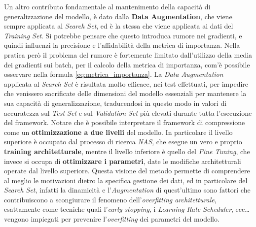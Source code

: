 Un altro contributo fondamentale al mantenimento della capacità di generalizzazione del modello, è dato dalla \textbf{Data Augmentation}, che viene sempre applicata al \textit{Search Set}, ed è la stessa che viene applicata ai dati del \textit{Training Set}. Si potrebbe pensare che questo introduca rumore nei gradienti, e quindi influenzi la precisione e l'affidabilità della metrica di importanza. Nella pratica però il problema del rumore è fortemente limitato dall'utilizzo della media dei gradienti sui batch, per il calcolo della metrica di importanza, com'è possibile osservare nella formula \ref{eq:metrica_importanza}. La \textit{Data Augmentation} applicata al \textit{Search Set} è risultata molto efficace, nei test effettuati, per impedire che venissero sacrificate delle dimensioni del modello essenziali per mantenere la sua capacità di generalizzazione, traducendosi in questo modo in valori di accuratezza sul \textit{Test Set} e sul \textit{Validation Set} più elevati durante tutta l'esecuzione del framework. \newline
Notare che è possibile interpretare il framework di compressione come un \textbf{ottimizzazione a due livelli} del modello. In particolare il livello superiore è occupato dal processo di ricerca \textit{NAS}, che esegue un vero e proprio \textbf{training architetturale}, mentre il livello inferiore è quello del \textit{Fine Tuning}, che invece si occupa di \textbf{ottimizzare i parametri}, date le modifiche architetturali operate dal livello superiore. Questa visione del metodo permette di comprendere al meglio le motivazioni dietro la specifica gestione dei dati, ed in particolare del \textit{Search Set}, infatti la dinamicità e l'\textit{Augmentation} di quest'ultimo sono fattori che contribuiscono a scongiurare il fenomeno dell'\textit{overfitting architetturale}, esattamente come tecniche quali l'\textit{early stopping}, i \textit{Learning Rate Scheduler}, ecc\dots vengono impiegati per prevenire l'\textit{overfitting} dei parametri del modello.

